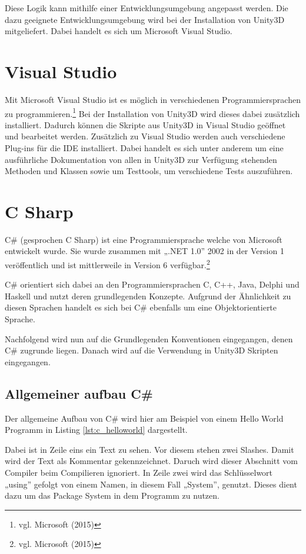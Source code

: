 Diese Logik kann mithilfe einer Entwicklungsumgebung angepasst werden. Die dazu geeignete Entwicklungsumgebung wird bei der Installation von Unity3D mitgeliefert. Dabei handelt es sich um Microsoft Visual Studio.

\section{Visual Studio}

Mit Microsoft Visual Studio ist es möglich in verschiedenen Programmiersprachen zu programmieren.\footnote{vgl. Microsoft \cite{microsoft1} (2015)} 
Bei der Installation von Unity3D wird dieses dabei zusätzlich installiert. Dadurch können die Skripte aus Unity3D in Visual Studio geöffnet und bearbeitet werden. Zusätzlich zu Visual Studio werden auch verschiedene Plug-ins für die IDE installiert. Dabei handelt es sich unter anderem um eine ausführliche Dokumentation von allen in Unity3D zur Verfügung stehenden Methoden und Klassen sowie um Testtools, um verschiedene Tests auszuführen. 

\section{C Sharp}

C\# (gesprochen C Sharp) ist eine Programmiersprache welche von Microsoft entwickelt wurde. Sie wurde zusammen mit „.NET 1.0” 2002 in der Version 1 veröffentlich und ist mittlerweile in Version 6 verfügbar.\footnote{vgl. Microsoft \cite{microsoft2} (2015)} 

C\# orientiert sich dabei an den Programmiersprachen C, C++, Java, Delphi und Haskell und nutzt deren grundlegenden Konzepte. Aufgrund der Ähnlichkeit zu diesen Sprachen handelt es sich bei C\# ebenfalls um eine Objektorientierte Sprache. 

Nachfolgend wird nun auf die Grundlegenden Konventionen eingegangen, denen C\# zugrunde liegen. Danach wird auf die Verwendung in Unity3D Skripten eingegangen.

\subsection{Allgemeiner aufbau C\#}

Der allgemeine Aufbau von C\# wird hier am Beispiel von einem Hello World Programm in Listing \ref{lst:c_helloworld} dargestellt. 

Dabei ist in Zeile eins ein Text zu sehen. Vor diesem stehen zwei Slashes. Damit wird der Text als Kommentar gekennzeichnet. Daruch wird dieser Abschnitt vom Compiler beim Compilieren ignoriert. In Zeile zwei wird das Schlüsselwort „using” gefolgt von einem Namen, in diesem Fall „System”, genutzt. Dieses dient dazu um das Package System in dem Programm zu nutzen.

